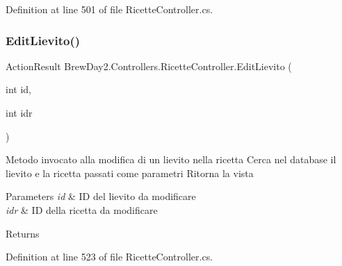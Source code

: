 Definition at line 501 of file Ricette\+Controller.\+cs.

\mbox{\label{class_brew_day2_1_1_controllers_1_1_ricette_controller_a64a41161a32ff16561aad6ad4cdb4d56}} 
\subsubsection{\texorpdfstring{Edit\+Lievito()}{EditLievito()}\hspace{0.1cm}{\footnotesize\ttfamily [1/2]}}
{\footnotesize\ttfamily Action\+Result Brew\+Day2.\+Controllers.\+Ricette\+Controller.\+Edit\+Lievito (\begin{DoxyParamCaption}\item[{int}]{id,  }\item[{int}]{idr }\end{DoxyParamCaption})}



Metodo invocato alla modifica di un lievito nella ricetta Cerca nel database il lievito e la ricetta passati come parametri Ritorna la vista 


\begin{DoxyParams}{Parameters}
{\em id} & ID del lievito da modificare\\
\hline
{\em idr} & ID della ricetta da modificare\\
\hline
\end{DoxyParams}
\begin{DoxyReturn}{Returns}

\end{DoxyReturn}


Definition at line 523 of file Ricette\+Controller.\+cs.

\mbox{\label{class_brew_day2_1_1_controllers_1_1_ricette_controller_a99187569fb5839412db4cc7408d0097c}} 
